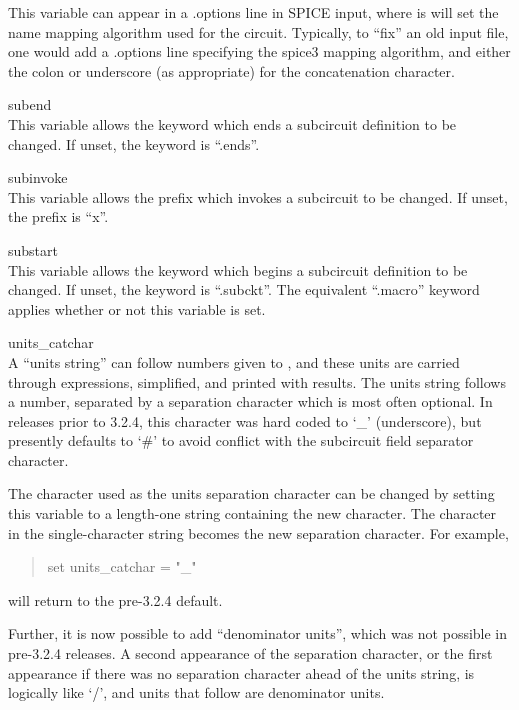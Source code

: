 \begin{description}
This variable can appear in a {\vt .options} line in SPICE input,
where is will set the name mapping algorithm used for the circuit. 
Typically, to ``fix'' an old input file, one would add a {\vt
.options} line specifying the {\vt spice3} mapping algorithm, and
either the colon or underscore (as appropriate) for the concatenation
character.

\item{\et subend}\\
This variable allows the keyword which ends a subcircuit definition
to be changed.  If unset, the keyword is ``{\vt .ends}''.

\item{\et subinvoke}\\
This variable allows the prefix which invokes a subcircuit to be
changed.  If unset, the prefix is ``{\vt x}''.

\item{\et substart}\\
This variable allows the keyword which begins a subcircuit definition
to be changed.  If unset, the keyword is ``{\vt .subckt}''.  The
equivalent ``{\vt .macro}'' keyword applies whether or not this
variable is set.

\item{\et units\_catchar}\\
A ``units string'' can follow numbers given to {\WRspice}, and these
units are carried through expressions, simplified, and printed with
results.  The units string follows a number, separated by a separation
character which is most often optional.  In releases prior to 3.2.4,
this character was hard coded to `{\vt \_}' (underscore), but
presently defaults to `{\vt \#}' to avoid conflict with the subcircuit
field separator character.

The character used as the units separation character can be changed by
setting this variable to a length-one string containing the new
character.  The character in the single-character string becomes the
new separation character.  For example,
\begin{quote}
\vt set units\_catchar = "\_"
\end{quote}
will return to the pre-3.2.4 default.

Further, it is now possible to add ``denominator units'', which was
not possible in pre-3.2.4 releases.  A second appearance of the
separation character, or the first appearance if there was no
separation character ahead of the units string, is logically like
`{\vt /}', and units that follow are denominator units.


\end{description}
